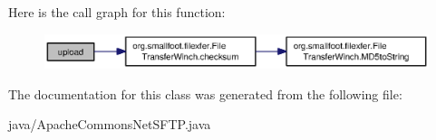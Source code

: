 Here is the call graph for this function\+:\nopagebreak
\begin{figure}[H]
\begin{center}
\leavevmode
\includegraphics[width=350pt]{classorg_1_1smallfoot_1_1filexfer_1_1ApacheCommonsNetSFTP_afa3dfccec4b989cafc56103eb1ee82a6_cgraph}
\end{center}
\end{figure}




The documentation for this class was generated from the following file\+:\begin{DoxyCompactItemize}
\item 
java/Apache\+Commons\+Net\+S\+F\+T\+P.\+java\end{DoxyCompactItemize}

